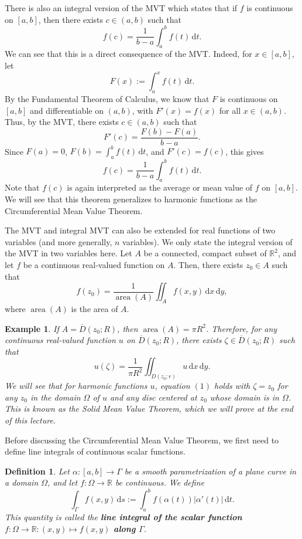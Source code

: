 \documentclass[10pt]{article}
\newcommand{\R}{\mathbb{R}}
\newcommand{\dd}{\,\mathrm{d}}
\DeclareMathOperator{\area}{area}
\theoremstyle{newstyle}
\newtheorem{defn}[thm]{Definition}
\newtheorem{exmp}[thm]{Example}
\begin{document}
There is also an integral version of the MVT which states that if $f$ is continuous on 
$[a, b]$, then there exists $c \in (a, b)$ such that 
\[ f(c) = \frac{1}{b-a} \int_a^b f(t)\dd t. \]
We can see that this is a direct consequence of the MVT. Indeed, for $x \in [a, b]$, let 
\[ F(x) := \int_a^x f(t)\dd t. \]
By the Fundamental Theorem of Calculus, we know that $F$ is continuous on $[a, b]$ and 
differentiable on $(a, b)$, with $F'(x) = f(x)$ for all $x \in (a, b)$. 
Thus, by the MVT, there exists $c \in (a, b)$ such that 
\[ F'(c) = \frac{F(b) - F(a)}{b-a}. \]
Since $F(a) = 0$, $F(b) = \int_a^b f(t) \dd t$, and $F'(c) = f(c)$, this gives 
\[ f(c) = \frac{1}{b-a} \int_a^b f(t)\dd t. \]
Note that $f(c)$ is again interpreted as the average or mean value of $f$ on $[a, b]$. 
We will see that this theorem generalizes to harmonic functions as the 
Circumferential Mean Value Theorem.

The MVT and integral MVT can also be extended for real functions of two variables (and 
more generally, $n$ variables). We only state the integral version of the MVT 
in two variables here. Let $A$ be a connected, compact subset of $\R^2$, 
and let $f$ be a continuous real-valued function on $A$. Then, there exists 
$z_0 \in A$ such that 
\[ f(z_0) = \frac{1}{\area(A)} \iint_A f(x, y)\dd x \dd y, \]
where $\area(A)$ is the area of $A$.

\begin{exmp}
If $A = \overline{D}(z_0; R)$, then $\area(A) = \pi R^2$. Therefore, for any continuous 
real-valued function $u$ on $\overline{D}(z_0; R)$, there exists $\zeta \in \overline{D}(z_0; R)$ 
such that 
\[ u(\zeta) = \frac{1}{\pi R^2} \iint_{D(z_0; r)} u\dd x \dd y. \tag{$1$} \]
We will see that for harmonic functions $u$, equation $(1)$ holds with $\zeta = z_0$ 
for any $z_0$ in the domain $\Omega$ of $u$ and any disc centered at $z_0$ whose domain is in 
$\Omega$. This is known as the Solid Mean Value Theorem, which we will prove at the 
end of this lecture. 
\end{exmp}

Before discussing the Circumferential Mean Value Theorem, we first need to define line integrals 
of continuous scalar functions. 

\begin{defn}
Let $\alpha : [a, b] \to \Gamma$ be a smooth parametrization of a plane curve in a domain 
$\Omega$, and let $f : \Omega \to \R$ be continuous. We define 
\[ \int_\Gamma f(x, y) \dd s := \int_a^b f(\alpha(t)) |\alpha'(t)| \dd t. \]
This quantity is called the {\bf line integral of the scalar function 
$f : \Omega \to \R : (x, y) \mapsto f(x, y)$ along $\Gamma$}.
\end{defn}
\end{document}

